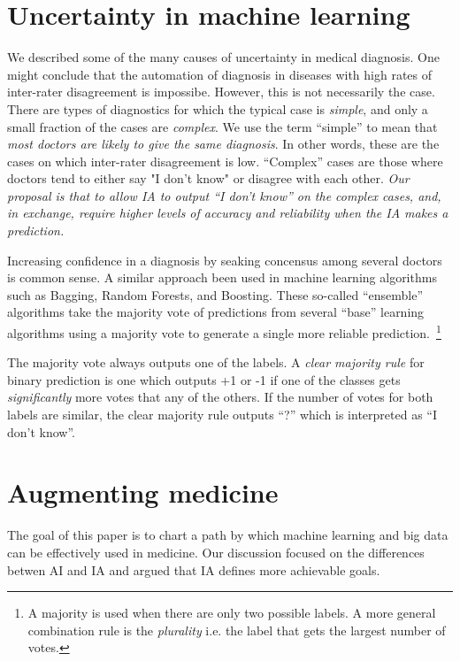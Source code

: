 \documentclass[11pt]{pnas-new}
\begin{document}
\section{Uncertainty in machine learning}

We described some of the many causes of uncertainty in medical
diagnosis. One might conclude that the automation of diagnosis in
diseases with high rates of inter-rater disagreement is
impossibe. However, this is not necessarily the case. There are types
of diagnostics for which the typical case is {\em simple}, and only a
small fraction of the cases are {\em complex}.  We use the term
``simple'' to mean that {\em most doctors are likely to give the same
  diagnosis}.  In other words, these are the cases on which
inter-rater disagreement is low. ``Complex'' cases are those where
doctors tend to either say "I don't know" or disagree with each other.
{\em Our proposal is that to allow IA to output ``I don't know'' on
  the complex cases, and, in exchange, require higher levels of
  accuracy and reliability when the IA makes a prediction.}

Increasing confidence in a diagnosis by seaking concensus among
several doctors is common sense. A similar approach  been
used in machine learning algorithms such as Bagging, Random Forests, and
Boosting\cite{}. These so-called ``ensemble'' algorithms take the
majority vote of predictions from several ``base'' learning algorithms using a majority
vote to generate a single more reliable prediction.~\footnote{A majority is
  used when there are only two possible labels. A more general
  combination rule is the {\em plurality} i.e. the label that gets the
  largest number of votes.}

The majority vote always outputs one of the labels. A {\em clear
  majority rule} for binary prediction is one which outputs +1 or -1
if one of the classes gets {\em significantly} more votes that any of
the others. If the number of votes for both labels are similar, the
clear majority rule outputs ``?'' which is interpreted as ``I don't
know''.

\section{Augmenting medicine}


The goal of this paper is to chart a path by which machine learning
and big data can be effectively used in medicine. Our discussion
focused on the differences betwen AI and IA and argued that IA
defines more achievable goals.
\end{document}
